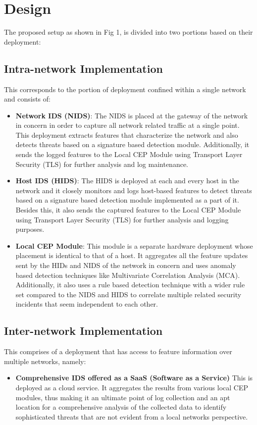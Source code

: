\documentclass[conference]{sig-alternate-05-2015}
\begin{document}
\section{Design}\label{subsec:design}
The proposed setup as shown in Fig 1, is divided into two portions based on their deployment:
\subsection{Intra-network Implementation}
  This corresponds to the portion of deployment confined within a single network and consists of:
  \begin{itemize}
    \item \textbf{Network IDS (NIDS)}: The NIDS is placed at the gateway of the network in concern in order to capture all network related traffic at a single point. This deployment extracts features that characterize the network and also detects threats based on a signature based detection module. Additionally, it sends the logged features to the Local CEP Module using Transport Layer Security (TLS) for further analysis and log maintenance.
    \item \textbf{Host IDS (HIDS)}: The HIDS is deployed at each and every host in the network and it closely monitors and logs host-based features to detect threats based on a signature based detection module implemented as a part of it. Besides this, it also sends the captured features to the Local CEP Module using Transport Layer Security (TLS) for further analysis and logging purposes.
    \item \textbf{Local CEP Module}: This module is a separate hardware deployment whose placement is identical to that of a host. It aggregates all the feature updates sent by the HIDs and NIDS of the network in concern and uses anomaly based detection techniques like Multivariate Correlation Analysis (MCA). Additionally, it also uses a rule based detection technique with a wider rule set compared to the NIDS and HIDS to correlate multiple related security incidents that seem independent to each other.
  \end{itemize}
\subsection{Inter-network Implementation}
  This comprises of a deployment that has access to feature information over multiple networks, namely:  
  \begin{itemize}
    \item \textbf{Comprehensive IDS offered as a SaaS (Software as a Service)}
This is deployed as a cloud service. It aggregates the results from various local CEP modules, thus making it an ultimate point of log collection and an apt location for a comprehensive analysis of the collected data to identify sophisticated threats that are not evident from a local networks perspective.
  \end{itemize}
\end{document}
